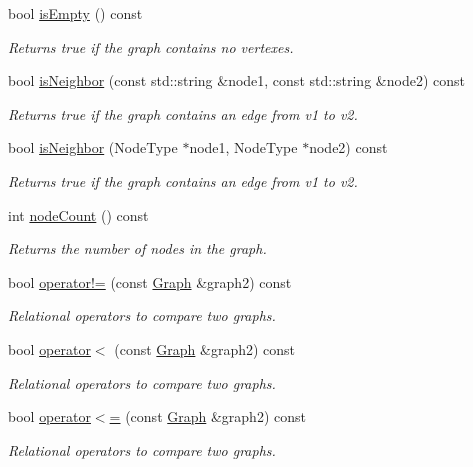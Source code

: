 \begin{DoxyCompactItemize}
bool \mbox{\hyperlink{classGraph_acf82f9b2937375c7b1cf3dccb3df3312}{is\+Empty}} () const
\begin{DoxyCompactList}\small\item\em Returns {\ttfamily true} if the graph contains no vertexes. \end{DoxyCompactList}\item 
bool \mbox{\hyperlink{classGraph_ab160bb64995133f6feb351cb23b031fb}{is\+Neighbor}} (const std\+::string \&node1, const std\+::string \&node2) const
\begin{DoxyCompactList}\small\item\em Returns true if the graph contains an edge from v1 to v2. \end{DoxyCompactList}\item 
bool \mbox{\hyperlink{classGraph_a9e752628a118c4a06a538067c95bbb28}{is\+Neighbor}} (Node\+Type $\ast$node1, Node\+Type $\ast$node2) const
\begin{DoxyCompactList}\small\item\em Returns true if the graph contains an edge from v1 to v2. \end{DoxyCompactList}\item 
int \mbox{\hyperlink{classGraph_a5dd1afdb4e1c75fbe51976bf6f70c922}{node\+Count}} () const
\begin{DoxyCompactList}\small\item\em Returns the number of nodes in the graph. \end{DoxyCompactList}\item 
bool \mbox{\hyperlink{classGraph_aafd8d1cec3a4d6b8cdcb58016e4d093a}{operator!=}} (const \mbox{\hyperlink{classGraph}{Graph}} \&graph2) const
\begin{DoxyCompactList}\small\item\em Relational operators to compare two graphs. \end{DoxyCompactList}\item 
bool \mbox{\hyperlink{classGraph_a1daf423faecc777e29a399812dc39ca2}{operator$<$}} (const \mbox{\hyperlink{classGraph}{Graph}} \&graph2) const
\begin{DoxyCompactList}\small\item\em Relational operators to compare two graphs. \end{DoxyCompactList}\item 
bool \mbox{\hyperlink{classGraph_a352607f2b21dd87b3d2a3957bbf3da7b}{operator$<$=}} (const \mbox{\hyperlink{classGraph}{Graph}} \&graph2) const
\begin{DoxyCompactList}\small\item\em Relational operators to compare two graphs. \end{DoxyCompactList}\item 

\end{DoxyCompactItemize}
